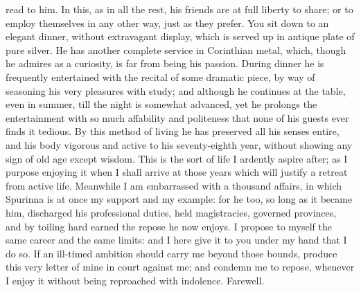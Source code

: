 read to him. In this, as in all the rest, his friends are at full liberty
to share; or to employ themselves in any other way, just as they prefer.
You sit down to an elegant dinner, without extravagant display, which is
served up in antique plate of pure silver. He has another complete service
in Corinthian metal, which, though he admires as a curiosity, is far from
being his passion. During dinner he is frequently entertained with the
recital of some dramatic piece, by way of seasoning his very pleasures
with study; and although he continues at the table, even in summer, till
the night is somewhat advanced, yet he prolongs the entertainment with so
much affability and politeness that none of his guests ever finds it
tedious. By this method of living he has preserved all his senses entire,
and his body vigorous and active to his seventy-eighth year, without
showing any sign of old age except wisdom. This is the sort of life I
ardently aspire after; as I purpose enjoying it when I shall arrive at
those years which will justify a retreat from active life. Meanwhile I am
embarrassed with a thousand affairs, in which Spurinna is at once my
support and my example: for he too, so long as it became him, discharged
his professional duties, held magistracies, governed provinces, and by
toiling hard earned the repose he now enjoys. I propose to myself the same
career and the same limits: and I here give it to you under my hand that I
do so. If an ill-timed ambition should carry me beyond those bounds,
produce this very letter of mine in court against me; and condemn me to
repose, whenever I enjoy it without being reproached with indolence.
Farewell.


